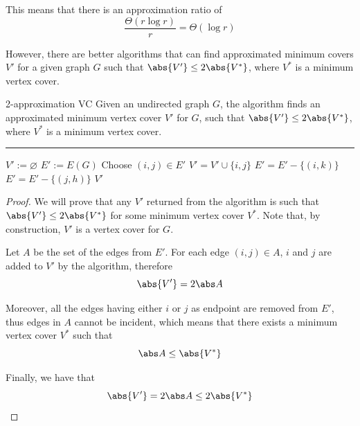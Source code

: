 \documentclass[a4paper, 12pt]{report}
\begin{document}
    This means that there is an approximation ratio of $$\dfrac{\Theta(r \log r)}{r} = \Theta(\log r)$$

    However, there are better algorithms that can find approximated minimum covers $V'$ for a given graph $G$ such that $\abs{V'} \le 2 \abs {V^*}$, where $V^*$ is a minimum vertex cover.

    \begin{framedalgo}{2-approximation VC}
        Given an undirected graph $G$, the algorithm finds an approximated minimum vertex cover $V'$ for $G$, such that $\abs{V'} \le 2 \abs {V^*}$, where $V^*$ is a minimum vertex cover. \\
        \hrule

        \quad
        \label{alg:2-approx_vc}
        \begin{algorithmic}[1]
                \State $V' := \varnothing$
                \State $E' := E(G)$
                    \State Choose $(i, j) \in E'$
                    \State $V' = V' \cup \{i, j\}$
                     
                        \State $E' = E' - \{(i, k) \}$
                    \EndFor
                     
                        \State $E' = E' - \{(j, h) \}$
                    \EndFor
                \EndWhile
                \State {} $V'$
            \EndFunction
        \end{algorithmic}
    \end{framedalgo}



    \begin{proof}
        We will prove that any $V'$ returned from the algorithm is such that $\abs{V'} \le 2 \abs {V^*}$ for some minimum vertex cover $V^*$. Note that, by construction, $V'$ is a vertex cover for $G$.

        Let $A$ be the set of the edges  from $E'$. For each edge $(i, j) \in A$, $i$ and $j$ are added to $V'$ by the algorithm, therefore $$\abs{V'} = 2 \abs A$$

        Moreover, all the edges having either $i$ or $j$ as endpoint are removed from $E'$, thus edges in $A$ cannot be incident, which means that there exists a minimum vertex cover $V^*$ such that $$\abs A \le \abs{V^*}$$

        Finally, we have that $$\abs{V'} = 2 \abs A \le 2 \abs{V^*}$$
    \end{proof}
\end{document}
